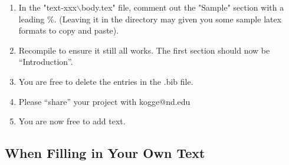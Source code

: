 \begin{enumerate}[noitemsep,nolistsep,leftmargin=*]
\item In the "text-xxx$\backslash$body.tex" file, comment out the "Sample" section with a leading \%. (Leaving it in the directory may given you some sample latex formats to copy and paste).

\item Recompile to ensure it still all works. The first section should now be ``Introduction''.

\item You are free to delete the entries in the .bib file.

\item Please ``share'' your project with kogge@nd.edu

\item You are now free to add text.
\end{enumerate}

\subsection{When Filling in Your Own Text}

